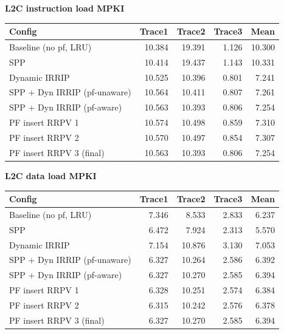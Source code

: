 \textbf{L2C instruction load MPKI}\\[2pt]
\begin{tabular}{lrrrr}\toprule
Config & Trace1 & Trace2 & Trace3 & Mean \\ \midrule
Baseline (no pf, LRU) & 10.384 & 19.391 & 1.126 & 10.300 \\
SPP & 10.414 & 19.437 & 1.143 & 10.331 \\
Dynamic IRRIP & 10.525 & 10.396 & 0.801 & 7.241 \\
SPP + Dyn IRRIP (pf-unaware) & 10.564 & 10.411 & 0.807 & 7.261 \\
SPP + Dyn IRRIP (pf-aware) & 10.563 & 10.393 & 0.806 & 7.254 \\
PF insert RRPV 1 & 10.574 & 10.498 & 0.859 & 7.310 \\
PF insert RRPV 2 & 10.570 & 10.497 & 0.854 & 7.307 \\
PF insert RRPV 3 (final) & 10.563 & 10.393 & 0.806 & 7.254 \\
\bottomrule\end{tabular}
\medskip

\textbf{L2C data load MPKI}\\[2pt]
\begin{tabular}{lrrrr}\toprule
Config & Trace1 & Trace2 & Trace3 & Mean \\ \midrule
Baseline (no pf, LRU) & 7.346 & 8.533 & 2.833 & 6.237 \\
SPP & 6.472 & 7.924 & 2.313 & 5.570 \\
Dynamic IRRIP & 7.154 & 10.876 & 3.130 & 7.053 \\
SPP + Dyn IRRIP (pf-unaware) & 6.327 & 10.264 & 2.586 & 6.392 \\
SPP + Dyn IRRIP (pf-aware) & 6.327 & 10.270 & 2.585 & 6.394 \\
PF insert RRPV 1 & 6.328 & 10.251 & 2.574 & 6.384 \\
PF insert RRPV 2 & 6.315 & 10.242 & 2.576 & 6.378 \\
PF insert RRPV 3 (final) & 6.327 & 10.270 & 2.585 & 6.394 \\
\bottomrule\end{tabular}
\medskip
